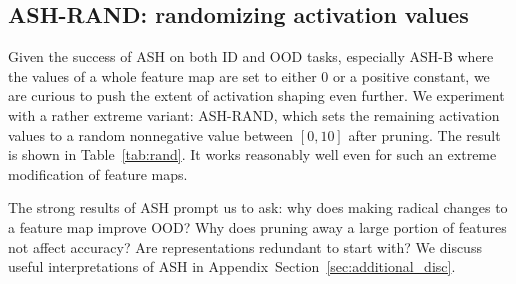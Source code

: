\documentclass{article}
\newcommand{\secref}[1]{Section~\ref{sec:#1}}
\newcommand{\tablabel}[1]{\label{tab:#1}}
\newcommand{\tabref}[1]{Table~\ref{tab:#1}}
\begin{document}
\subsection{ASH-RAND: randomizing activation values}

Given the success of ASH on both ID and OOD tasks, especially ASH-B where the values of a whole feature map are set to either $0$ or a positive constant, we are curious to push the extent of activation shaping even further. We experiment with a rather extreme variant: ASH-RAND, which sets the remaining activation values to a random nonnegative value between $[0, 10]$ after pruning. The result is shown in \tabref{rand}. It works reasonably well even for such an extreme modification of feature maps.

The strong results of ASH prompt us to ask: why does making radical changes to a feature map improve OOD? Why does pruning away a large portion of features not affect accuracy? Are representations redundant to start with? We discuss useful interpretations of ASH in Appendix~\secref{additional_disc}. 

\begin{SCtable}
\centering
{}
\caption{\textbf{An extreme variant of ASH: randomized activations}. ASH-RAND sets un-pruned activations to random values between 0 and 10. All experiments are on ImageNet with ResNet-50, and the OOD performance is averaged across 4 datasets.
ASH-RAND is surprisingly comparable to, although not better than, ASH-B and ASH-S. It consistently beats simple baselines like Energy, Softmax and ODIN.
} 
\tablabel{rand}
\end{SCtable}
\end{document}
